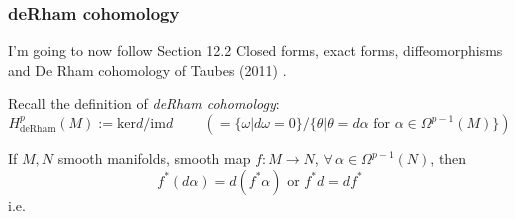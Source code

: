 \documentclass[10pt]{amsart}
\begin{document}
\subsubsection{deRham cohomology}

I'm going to now follow Section 12.2 Closed forms, exact forms, diffeomorphisms and De Rham cohomology of Taubes (2011) \cite{CTaubes2011}.  

Recall the definition of \emph{deRham cohomology}:
\begin{equation}
  H^p_{\text{deRham}}(M) := \text{ker}d/\text{im}d \qquad \, \left( = \lbrace \omega | d\omega = 0 \rbrace / \lbrace \theta | \theta = d\alpha \text{ for } \alpha \in \Omega^{p-1}(M) \rbrace \right)
\end{equation}

If $M,N$ smooth manifolds, smooth map $f: M \to N$, $\forall \, \alpha \in \Omega^{p-1}(N)$, then
\begin{equation}
  f^*(d\alpha ) =d(f^*\alpha) \text{ or } f^* d = df^*
\end{equation}
i.e.
\end{document}
